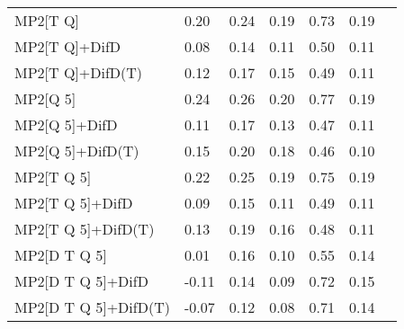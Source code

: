 \begin{table}
\begin{tabular}{l l l l l l l }
    MP2[T Q] & 0.20 & 0.24 & 0.19 & 0.73 & 0.19 \\ 
    MP2[T Q]+DifD & 0.08 & 0.14 & 0.11 & 0.50 & 0.11 \\ 
    MP2[T Q]+DifD(T) & 0.12 & 0.17 & 0.15 & 0.49 & 0.11 \\ 
    MP2[Q 5] & 0.24 & 0.26 & 0.20 & 0.77 & 0.19 \\ 
    MP2[Q 5]+DifD & 0.11 & 0.17 & 0.13 & 0.47 & 0.11 \\ 
    MP2[Q 5]+DifD(T) & 0.15 & 0.20 & 0.18 & 0.46 & 0.10 \\ 
    MP2[T Q 5] & 0.22 & 0.25 & 0.19 & 0.75 & 0.19 \\ 
    MP2[T Q 5]+DifD & 0.09 & 0.15 & 0.11 & 0.49 & 0.11 \\ 
    MP2[T Q 5]+DifD(T) & 0.13 & 0.19 & 0.16 & 0.48 & 0.11 \\ 
    MP2[D T Q 5] & 0.01 & 0.16 & 0.10 & 0.55 & 0.14 \\ 
    MP2[D T Q 5]+DifD & -0.11 & 0.14 & 0.09 & 0.72 & 0.15 \\ 
    MP2[D T Q 5]+DifD(T) & -0.07 & 0.12 & 0.08 & 0.71 & 0.14 \\ 
    \hline
  \end{tabular}
\end{table}
